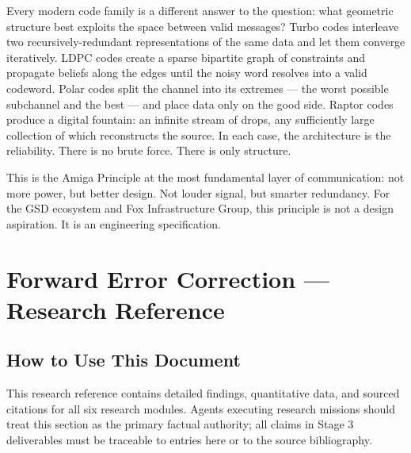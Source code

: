 \documentclass[11pt,letterpaper]{article}
\newcommand{\stageheader}[2]{%
  \noindent\colorbox{#2}{\makebox[\textwidth][l]{%
    \textcolor{white}{\bfseries\sffamily\hspace{6pt}#1\hspace{6pt}}}}%
  \vspace{0.5em}\par%
}
\begin{document}
Every modern code family is a different answer to the question: what geometric structure best exploits the space between valid messages? Turbo codes interleave two recursively-redundant representations of the same data and let them converge iteratively. LDPC codes create a sparse bipartite graph of constraints and propagate beliefs along the edges until the noisy word resolves into a valid codeword. Polar codes split the channel into its extremes --- the worst possible subchannel and the best --- and place data only on the good side. Raptor codes produce a digital fountain: an infinite stream of drops, any sufficiently large collection of which reconstructs the source. In each case, the architecture is the reliability. There is no brute force. There is only structure.

This is the Amiga Principle at the most fundamental layer of communication: not more power, but better design. Not louder signal, but smarter redundancy. For the GSD ecosystem and Fox Infrastructure Group, this principle is not a design aspiration. It is an engineering specification.

\newpage

\stageheader{STAGE 2 --- RESEARCH REFERENCE}{secondary}

\section{Forward Error Correction --- Research Reference}

\subsection{How to Use This Document}

This research reference contains detailed findings, quantitative data, and sourced citations for all six research modules. Agents executing research missions should treat this section as the primary factual authority; all claims in Stage 3 deliverables must be traceable to entries here or to the source bibliography.
\end{document}
